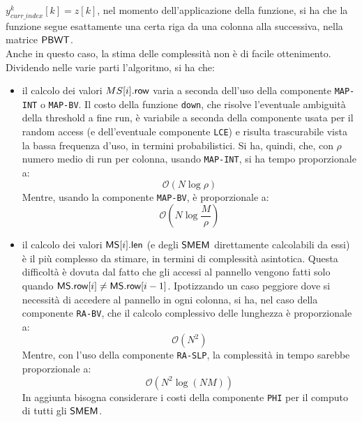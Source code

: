 $y^k_{curr\_index}[k]=z[k]$, nel momento dell'applicazione della funzione, si ha
che la funzione segue esattamente una certa riga da una colonna alla
successiva, nella matrice $\mbox{\rm {\sf PBWT}}$. \\
Anche in questo caso, la stima delle
complessità non è di facile ottenimento. Dividendo nelle varie parti
l'algoritmo, si ha che:
\begin{itemize}
  \item il calcolo dei valori $MS[i].\mbox{\rm {\sf row}}$ varia a
  seconda dell'uso 
  della componente \texttt{MAP-INT} o \texttt{MAP-BV}. Il costo della funzione
  \texttt{down}, che risolve l'eventuale ambiguità della threshold a fine run,
  è variabile a seconda della componente usata per il random access (e 
  dell'eventuale componente \texttt{LCE}) e risulta trascurabile vista la bassa
  frequenza d'uso, in termini probabilistici. Si ha, quindi, che, con $\rho$
  numero medio di run per colonna, usando \texttt{MAP-INT}, si ha tempo
  proporzionale a:
  \begin{equation}
    \label{eq:msthr1int}
    \mathcal{O}(N\log\rho)
  \end{equation}
  Mentre, usando la componente \texttt{MAP-BV}, è proporzionale a:
  \begin{equation}
    \label{eq:msthr1bv}
    \mathcal{O}\left(N\log\frac{M}{\rho}\right)
  \end{equation}
  \item il calcolo dei valori $\mbox{\rm {\sf MS}}[i].\mbox{\rm {\sf len}}$ (e degli $\mbox{\rm {\sf SMEM}}$ direttamente
  calcolabili da essi) è il
  più complesso da 
  stimare, in termini di complessità asintotica. Questa difficoltà è dovuta dal
  fatto che gli accessi al pannello vengono fatti solo quando $\mbox{\rm {\sf MS}}.\mbox{\rm {\sf row}}[i]\neq
  \mbox{\rm {\sf MS}}.\mbox{\rm {\sf row}}[i-1]$.
  Ipotizzando un caso peggiore dove si necessità di accedere al pannello in ogni
  colonna, si ha, nel caso della componente \texttt{RA-BV}, che il calcolo
  complessivo delle lunghezza è proporzionale a:
  \begin{equation}
    \label{eq:msthr2bv}
    \mathcal{O}(N^2)
  \end{equation}
  Mentre, con l'uso della componente \texttt{RA-SLP}, la complessità in tempo
  sarebbe proporzionale a: 
  \begin{equation}
    \label{eq:msthr2slp}
    \mathcal{O}\left(N^2\log (NM)\right)
  \end{equation}
  In aggiunta bisogna considerare i costi della componente \texttt{PHI} per il
  computo di tutti gli $\mbox{\rm {\sf SMEM}}$.
\end{itemize}
